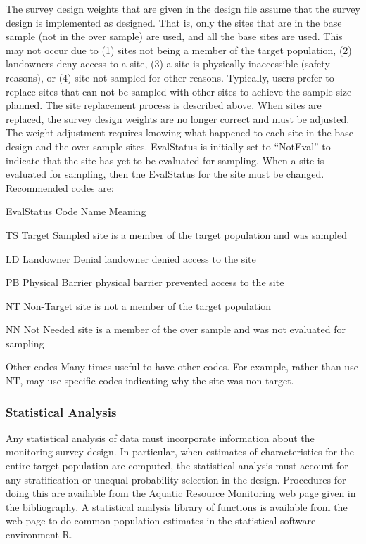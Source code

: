 \documentclass[
]{article}
\begin{document}
The survey design weights that are given in the design file assume that
the survey design is implemented as designed. That is, only the sites
that are in the base sample (not in the over sample) are used, and all
the base sites are used. This may not occur due to (1) sites not being a
member of the target population, (2) landowners deny access to a site,
(3) a site is physically inaccessible (safety reasons), or (4) site not
sampled for other reasons. Typically, users prefer to replace sites that
can not be sampled with other sites to achieve the sample size planned.
The site replacement process is described above. When sites are
replaced, the survey design weights are no longer correct and must be
adjusted. The weight adjustment requires knowing what happened to each
site in the base design and the over sample sites. EvalStatus is
initially set to ``NotEval'' to indicate that the site has yet to be
evaluated for sampling. When a site is evaluated for sampling, then the
EvalStatus for the site must be changed. Recommended codes are:

EvalStatus Code \textbar{} Name \textbar{} Meaning

TS \textbar{} Target Sampled \textbar{} site is a member of the target
population and was sampled

LD \textbar{} Landowner Denial \textbar{} landowner denied access to the
site

PB \textbar{} Physical Barrier\textbar{} physical barrier prevented
access to the site

NT \textbar{} Non-Target \textbar{} site is not a member of the target
population

NN \textbar{} Not Needed \textbar{} site is a member of the over sample
and was not evaluated for sampling

Other codes Many times useful to have other codes. For example, rather
than use NT, may use specific codes indicating why the site was
non-target.

\hypertarget{statistical-analysis}{%
\subsubsection{Statistical Analysis}\label{statistical-analysis}}

Any statistical analysis of data must incorporate information about the
monitoring survey design. In particular, when estimates of
characteristics for the entire target population are computed, the
statistical analysis must account for any stratification or unequal
probability selection in the design. Procedures for doing this are
available from the Aquatic Resource Monitoring web page given in the
bibliography. A statistical analysis library of functions is available
from the web page to do common population estimates in the statistical
software environment R.
\end{document}
